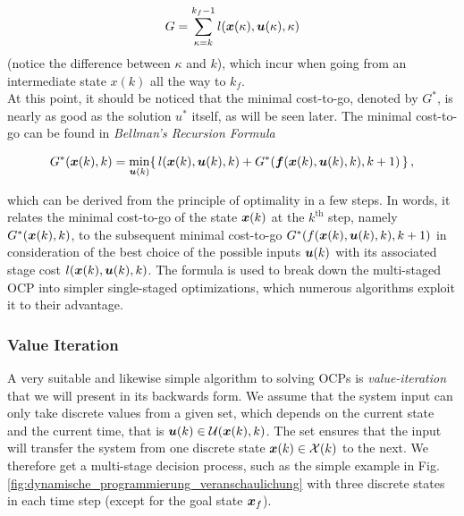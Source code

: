 \begin{align*}
	G = \sum_{\kappa = k}^{k_f-1} l(\bs x(\kappa), \bs u(\kappa),\kappa) %
\end{align*}
(notice the difference between $\kappa$ and $k$), which incur when going from an intermediate state $x(k)$ all the way to $k_f$.\\
At this point, it should be noticed that the minimal cost-to-go, denoted by $G^\ast$, is nearly as good as the solution $u^\ast$ itself, as will be seen later. The minimal cost-to-go can be found in \emph{Bellman’s Recursion Formula}
\begin{mydef}
\begin{align*}
 G^\ast(\boldsymbol{x}(k),k) = \min_{\boldsymbol{u}(k)}\{\,l(\boldsymbol{x}(k), \boldsymbol{u}(k), k) + G^\ast(\boldsymbol{f}(\boldsymbol{x}(k), \boldsymbol{u}(k), k), k+1)\,\} \, ,
\end{align*}
\end{mydef}
which can be derived from the principle of optimality in a few steps. 
In words, it relates the minimal cost-to-go of the state $\boldsymbol{x}(k)$ at the $k^\mathrm{th}$  step, namely $G^\ast (\boldsymbol{x}(k),k)$, to the subsequent minimal cost-to-go $G^\ast (f(\boldsymbol{x}(k),\boldsymbol{u}(k),k),k+1)$ in consideration of the best choice of the possible inputs $\boldsymbol{u}(k)$ with its associated stage cost $l(\boldsymbol{x}(k),\boldsymbol{u}(k),k)$. The formula is used to break down the multi-staged OCP into simpler single-staged optimizations, which numerous algorithms exploit it to their advantage.

\subsubsection{Value Iteration}\label{57.3.3.2}


A very suitable and likewise simple algorithm to solving OCPs is \emph{value-iteration} that we will present in its backwards form. 
We assume that the system input can only take discrete values from a given set, which depends on the current state and the current time, that is $\boldsymbol{u}(k) \in \mathcal U(\boldsymbol{x}(k),k)$. 
The set ensures that the input will transfer the system from one discrete state $\boldsymbol{x}(k) \in \mathcal X(k)$ to the next. We therefore get a multi-stage decision process, such as the simple example in  Fig. \ref{fig:dynamische_programmierung_veranschaulichung} with three discrete states in each time step (except for the goal state $\boldsymbol{x}_f$). 

